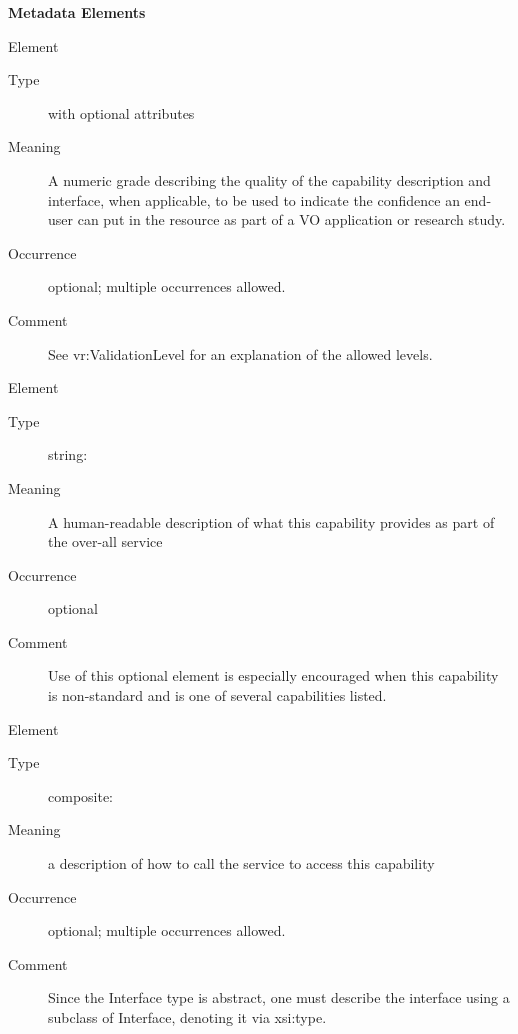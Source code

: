 \documentclass[11pt,a4paper]{ivoa}
\begin{document}
\vspace{0.5ex}\noindent\textbf{ Metadata Elements}

\begingroup\small\begin{bigdescription}\item[Element \xmlel{validationLevel}]
\begin{description}
\item[Type]  with optional attributes
\item[Meaning] 
                  A numeric grade describing the quality of the
                  capability description and interface, when applicable, 
                  to be used to indicate the confidence an end-user
                  can put in the resource as part of a VO application
                  or research study. 
               
\item[Occurrence] optional; multiple occurrences allowed.
\item[Comment] 
                  See vr:ValidationLevel for an explanation of the
                  allowed levels.  
               

\end{description}
\item[Element \xmlel{description}]
\begin{description}
\item[Type] string: 
\item[Meaning] 
                  A human-readable description of what this capability 
                  provides as part of the over-all service 
               
\item[Occurrence] optional
\item[Comment] 
                  Use of this optional element is especially encouraged when
                  this capability is non-standard and is one of several 
                  capabilities listed.
               

\end{description}
\item[Element \xmlel{interface}]
\begin{description}
\item[Type] composite: 
\item[Meaning] 
                  a description of how to call the service to access
                  this capability
               
\item[Occurrence] optional; multiple occurrences allowed.
\item[Comment] 
                  Since the Interface type is abstract, one must describe
                  the interface using a subclass of Interface, denoting
                  it via xsi:type.
               

\end{description}
\end{bigdescription}
\end{document}
